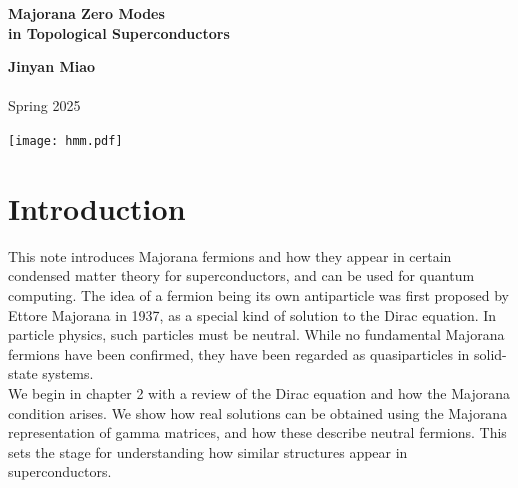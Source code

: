 \documentclass[11pt, oneside]{book}
\theoremstyle{break}
\theoremstyle{break}
\begin{document}
	\begin{titlepage}
		\begin{center}
			\vspace*{0.5cm}
			\LARGE \color{black}
				\textbf{Majorana Zero Modes \\in Topological Superconductors}\\
			\vspace{0.5cm}			
			\Large \color{black}
			\vspace{1.5cm}

			
			
			
			\vspace{2cm}
			\LARGE
				\textbf{Jinyan Miao}\\
				\\
				\hfill\break
				\LARGE Spring 2025\\
			\vspace{1cm}

		\vspace*{\fill}
		\end{center}		

	\begin{marginfigure}[-3.1cm]
		\hspace*{-2.9cm}
		\texttt{[image: hmm.pdf]}
	\end{marginfigure}

	\end{titlepage}


\newpage
\tableofcontents 



\chapter{Introduction}
This note introduces Majorana fermions and how they appear in certain condensed matter theory for superconductors, and can be used for quantum computing. The idea of a fermion being its own antiparticle was first proposed by Ettore Majorana in 1937, as a special kind of solution to the Dirac equation. In particle physics, such particles must be neutral. While no fundamental Majorana fermions have been confirmed, they have been regarded as quasiparticles in solid-state systems.\\

We begin in chapter 2 with a review of the Dirac equation and how the Majorana condition arises. We show how real solutions can be obtained using the Majorana representation of gamma matrices, and how these describe neutral fermions. This sets the stage for understanding how similar structures appear in superconductors.\\
\end{document}
